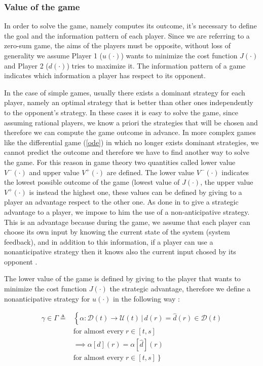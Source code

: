 \subsubsection{Value of the game}
In order to solve the game, namely computes its outcome, it's necessary to define the goal and the information pattern of each player. Since we are referring to a zero-sum game, the aims of the players must be opposite, without loss of generality we assume Player 1 ($u(\cdot)$) wants to minimize the cost function $J(\cdot)$ and Player 2 ($d(\cdot)$) tries to maximize it. The information pattern of a game indicates which information a player has respect to its opponent.

In the case of simple games, usually there exists a dominant strategy for each player, namely an optimal strategy that is better than other ones independently to the opponent's strategy. In these cases it is easy to solve the game, since assuming rational players, we know a priori the strategies that will be chosen and therefore we can compute the game outcome in advance. In more complex games like the differential game (\ref{ode}) in which no longer exists dominant strategies, we cannot predict the outcome and therefore we have to find another way to solve the game. For this reason in game theory two quantities called lower value $V^-(\cdot)$ and upper value $V^+(\cdot)$ are defined. The lower value $V^-(\cdot)$ indicates the lowest possible outcome of the game (lowest value of $J(\cdot)$, the upper value $V^+(\cdot)$ is instead the highest one, these values can be defined by giving to a player an advantage respect to the other one. As done in \cite{evans} \cite{reach_avoid_with_dist} \cite{brief_intro} to give a strategic advantage to a player, we impose to him the use of a non-anticipative strategy. This is an advantage because during the game, we assume that each player can choose its own input by knowing the current state of the system (system feedback), and in addition to this information, if a player can use a nonanticipative strategy then it knows also the current input chosed by its opponent \cite{mitchell_time_dep_HJ}.

The lower value of the game is defined by giving to the player that wants to minimize the cost function $J(\cdot)$ the strategic advantage, therefore we define a nonanticipative strategy for $u(\cdot)$ in the following way \cite{evans}:

\begin{equation}
	\label{eq:non_ant_stra_u}
	\begin{split}
		\gamma \in \Gamma \triangleq 
		& \left\{ 
			\alpha : \mathcal{D}(t) \rightarrow \mathcal{U}(t)\,|\,d(r) = \hat{d}(r) \in \mathcal{D}(t)
		\right. \\ 
		& \textrm{for almost every} \;r \in [t,s] \\
		& \implies \alpha[d](r)= \alpha[\hat{d}](r) \\
		& \left. 
			\textrm{for almost every} \; r \in [t,s] 
		\right\}  
	\end{split}
\end{equation}

